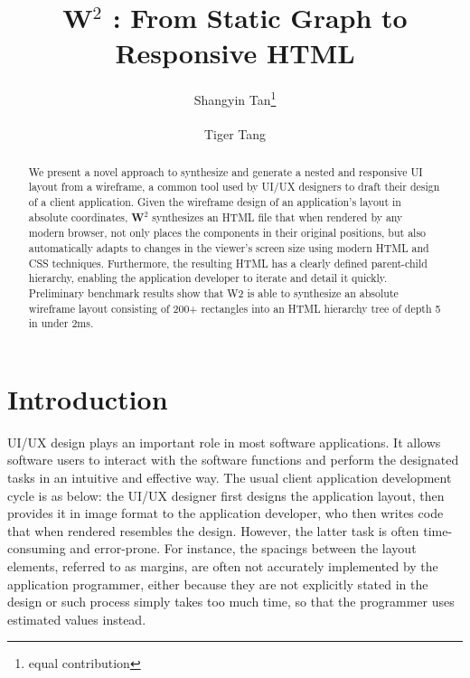 \documentclass[runningheads]{llncs}
\makeatletter
\newcommand{\W}{\textbf{W}$^2$ }
\newcommand{\printfnsymbol}[1]{%
  \textsuperscript{\@fnsymbol{#1}}%
}
\makeatother
\begin{document}
%
\title{\W: From Static Graph to Responsive HTML}
%
%
\author{Shangyin Tan\thanks{equal contribution} \and
Tiger Tang\printfnsymbol{1}}
%
%
%
\maketitle %
%
\begin{abstract}
  We present a novel approach to synthesize and generate a nested and responsive UI layout from a wireframe, a common tool used by UI/UX designers to draft their design of a client application. Given the wireframe design of an application's layout in absolute coordinates, \W synthesizes an HTML file that when rendered by any modern browser, not only places the components in their original positions, but also automatically adapts to changes in the viewer's screen size using modern HTML and CSS techniques. Furthermore, the resulting HTML has a clearly defined parent-child hierarchy, enabling the application developer to iterate and detail it quickly. Preliminary benchmark results show that W2 is able to synthesize an absolute wireframe layout consisting of 200+ rectangles into an HTML hierarchy tree of depth 5 in under 2ms.
\end{abstract}
%
%
%
\section{Introduction}
UI/UX design plays an important role in most software applications. It allows software users to interact with the software functions and perform the designated tasks in an intuitive and effective way. The usual client application development cycle is as below: the UI/UX designer first designs the application layout, then provides it in image format to the application developer, who then writes code that when rendered resembles the design. However, the latter task is often time-consuming and error-prone. For instance, the spacings between the layout elements, referred to as margins, are often not accurately implemented by the application programmer, either because they are not explicitly stated in the design or such process simply takes too much time, so that the programmer uses estimated values instead.
\end{document}
